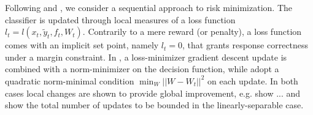 \documentclass[preprint,12pt,authoryear]{elsarticle}
\begin{document}
Following   \cite{kivinen2004online} and \cite{crammer2006online}, we consider a sequential approach to risk minimization.
The classifier is updated through local measures of a loss function $l_t = l(x_t,\tilde{y}_t,f_t,W_t)$. Contrarily to a mere reward (or penalty), a loss function comes with an implicit set point, namely $l_t=0$, that grants response correctness under a margin constraint. In \cite{kivinen2004online}, a loss-minimizer gradient descent update is combined with a norm-minimizer on the decision function, while \cite{crammer2006online} adopt a quadratic norm-minimal condition $\min_W ||W - W_t||^2$ on each update. In both cases local changes are shown to provide global improvement, e.g. {\color{red} \cite{kivinen2004online} show ...} and \cite{crammer2006online} show the total number of updates to be bounded in the linearly-separable case.

\end{document}
